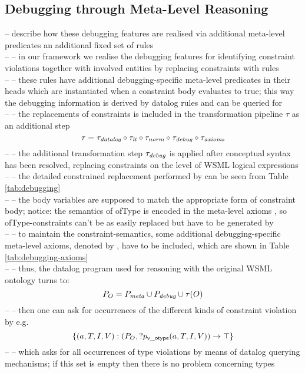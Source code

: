 \subsection{Debugging through Meta-Level Reasoning}
-- describe how these debugging features are realised via additional meta-level predicates an additional fixed set of rules \\
-- -- in our framework we realise the debugging features for identifying constraint violations together with involved entities by replacing constraints with rules \\
-- -- these rules have additional debugging-specific meta-level predicates in their heads which are instantiated when a constraint body evaluates to true; this way the debugging information is derived by datalog rules and can be queried for \\
-- -- the replacements of constraints is included in the transformation pipeline $\tau$ as an additional step \\
\begin{displaymath}
    \tau = \transdlog \circ \translt \circ \transnorm \circ \transdebug \circ \transax
\end{displaymath}
-- -- the additional transformation step $\transdebug$ is applied after conceptual syntax has been resolved, replacing constraints on the level of WSML logical expressions \\
-- -- the detailed constrained replacement performed by \transdebug can be seen from Table \ref{tab:debugging} \\
-- -- the body variables are supposed to match the appropriate form of constraint body; notice: the semantics of ofType is encoded in the meta-level axioms \mlaxioms, so ofType-constraints can't be as easily replaced but have to be generated by \transdebug \\
-- -- to maintain the constraint-semantics, some additional debugging-specific meta-level axioms, denoted by \debugaxioms, have to be included, which are shown in Table \ref{tab:debugging-axioms} \\
-- -- thus, the datalog program used for reasoning with the original WSML ontology turns to: \\
\begin{displaymath}
    P_O = \mlaxioms \cup \debugaxioms \cup \tau(O)
\end{displaymath}
-- -- then one can ask for occurrences of the different kinds of constraint violation by e.g. \\
\begin{displaymath}
    \{(a,T,I,V) : (P_O , ?p_{\mathrm{\sf v\_otype}}(a,T,I,V)) \rightarrow \top \}
\end{displaymath}
-- -- which asks for all occurrences of type violations by means of datalog querying mechanisms; if this set is empty then there is no problem concerning types \\

